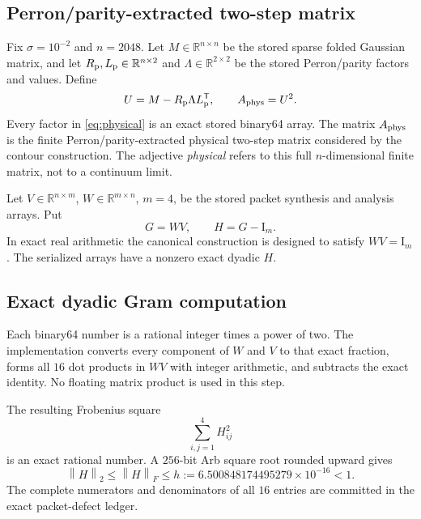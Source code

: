 \documentclass[11pt]{article}
\theoremstyle{definition}
\theoremstyle{remark}
\newcommand{\Id}{\mathrm I}
\newcommand{\norm}[1]{\left\lVert#1\right\rVert}
\newcommand{\Aphys}{A_{\rm phys}}
\begin{document}
\subsection{Perron/parity-extracted two-step matrix}

Fix \(\sigma=10^{-2}\) and \(n=2048\).  Let
\(M\in\mathbb R^{n\times n}\) be the stored sparse folded Gaussian matrix,
and let \(R_{\rm p},L_{\rm p}\in\mathbb R^{n\times2}\) and
\(\Lambda\in\mathbb R^{2\times2}\) be the stored Perron/parity factors and
values.  Define
\begin{equation}
 U=M-R_{\rm p}\Lambda L_{\rm p}^{\mathsf T},
 \qquad
 \Aphys=U^2.
 \label{eq:physical}
\end{equation}
Every factor in \cref{eq:physical} is an exact stored binary64 array.  The
matrix \(\Aphys\) is the finite Perron/parity-extracted physical two-step
matrix considered by the contour construction.  The adjective
\emph{physical} refers to this full \(n\)-dimensional finite matrix, not to
a continuum limit.

Let \(V\in\mathbb R^{n\times m}\), \(W\in\mathbb R^{m\times n}\), \(m=4\),
be the stored packet synthesis and analysis arrays.  Put
\begin{equation}
 G=WV,\qquad H=G-\Id_m.
 \label{eq:gram-defect}
\end{equation}
In exact real arithmetic the canonical construction is designed to satisfy
\(WV=\Id_m\).  The serialized arrays have a nonzero exact dyadic \(H\).

\subsection{Exact dyadic Gram computation}

Each binary64 number is a rational integer times a power of two.  The
implementation converts every component of \(W\) and \(V\) to that exact
fraction, forms all \(16\) dot products in \(WV\) with integer arithmetic,
and subtracts the exact identity.  No floating matrix product is used in
this step.

The resulting Frobenius square
\[
 \sum_{i,j=1}^4 H_{ij}^2
\]
is an exact rational number.  A \(256\)-bit Arb square root rounded upward
gives
\begin{equation}
 \norm{H}_2\leq\norm{H}_F
 \leq h:=6.500848174495279\times10^{-16}<1.
 \label{eq:h-bound}
\end{equation}
The complete numerators and denominators of all \(16\) entries are committed
in the exact packet-defect ledger.
\end{document}
